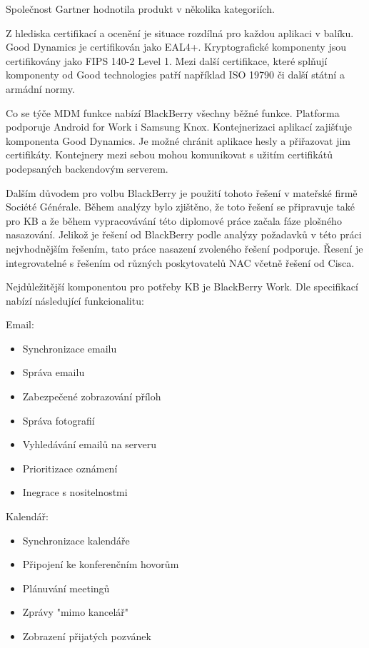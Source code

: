 Společnost Gartner hodnotila produkt v několika kategoriích. 

Z hlediska certifikací a ocenění je situace rozdílná pro každou aplikaci v balíku. Good Dynamics je certifikován jako EAL4+. Kryptografické komponenty jsou certifikovány jako FIPS 140-2 Level 1. Mezi další certifikace, které splňují komponenty od Good technologies patří například ISO 19790 či další státní a armádní normy.

Co se týče MDM funkce nabízí BlackBerry všechny běžné funkce. Platforma podporuje Android for Work i Samsung Knox. Kontejnerizaci aplikací zajišťuje komponenta Good Dynamics. Je možné chránit aplikace hesly a přiřazovat jim certifikáty. Kontejnery mezi sebou mohou komunikovat s užitím certifikátů podepsaných backendovým serverem. 


Dalším důvodem pro volbu BlackBerry je použití tohoto řešení v mateřské firmě Société Générale. Během analýzy bylo zjištěno, že toto řešení se připravuje také pro KB a že během vypracovávání této diplomové práce začala fáze plošného nasazování. Jelikož je řešení od BlackBerry podle analýzy požadavků v této práci nejvhodnějším řešením, tato práce nasazení zvoleného řešení podporuje. Řesení je integrovatelné s řešením od různých poskytovatelů NAC včetně řešení od Cisca.    

Nejdůležitější komponentou pro potřeby KB je BlackBerry Work. Dle specifikací  nabízí následující funkcionalitu:

Email:
\begin{itemize}
    \item Synchronizace emailu
    \item Správa emailu
    \item Zabezpečené zobrazování příloh
    \item Správa fotografií
    \item Vyhledávání emailů na serveru
    \item Prioritizace oznámení
    \item Inegrace s nositelnostmi
\end{itemize}

Kalendář:
\begin{itemize}
 \item Synchronizace kalendáře
 \item Připojení ke konferenčním hovorům
 \item Plánuvání meetingů
 \item Zprávy "mimo kancelář"
 \item Zobrazení přijatých pozvánek
\end{itemize}

